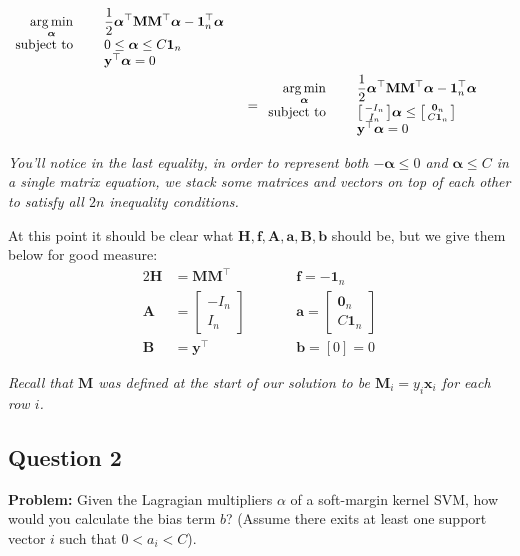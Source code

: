 \documentclass{article}
\renewcommand{\vec}[1]{\mathbf{#1}}
\newcommand{\mat}[1]{\mathbf{#1}}
\DeclareMathOperator*{\argmin}{arg\,min}
\newcommand{\icol}[1]{%
  \begin{bsmallmatrix}#1\end{bsmallmatrix}%
}
\begin{document}
\begin{align*}
\begin{array}{rcll}
        \displaystyle\argmin_{\bm\alpha} &~ &\displaystyle\frac{1}{2}\bm\alpha^\top\mat M\mat M^\top\bm\alpha-\vec1_n^\top\bm\alpha&\\
        \text{subject to}&~ &0\le\bm\alpha\le C\vec 1_n\\
        &~ &\vec y^\top\bm\alpha=0
    \end{array}\\
    &=\begin{array}{rcll}
        \displaystyle\argmin_{\bm\alpha} &~ &\displaystyle\frac{1}{2}\bm\alpha^\top\mat M\mat M^\top\bm\alpha-\vec1_n^\top\bm\alpha&\\
        \text{subject to}&~ &\icol{-I_n\\I_n}\bm\alpha\le\icol{\vec0_n\\C\vec 1_n}\\
        &~ &\vec y^\top\bm\alpha=0
    \end{array}
\end{align*}

\textit{You'll notice in the last equality, in order to represent both $-\bm\alpha\le 0$ and $\bm\alpha\le C$ in a single matrix equation, we stack some matrices and vectors on top of each other to satisfy all $2n$ inequality conditions.}
\bigskip

At this point it should be clear what $\mat H,\vec f, \mat A, \vec a, \mat B, \vec b$ should be, but we give them below for good measure:
\begin{alignat*}{2}
    \mat H&=\mat M\mat M^\top\qquad &&\vec f=-\vec 1_n\\
    \mat A&=\begin{bmatrix}
        -I_n\\I_n
    \end{bmatrix}\qquad &&\vec a=\begin{bmatrix}
        \vec 0_n\\C\vec 1_n
    \end{bmatrix}\\
    \mat B&=\vec y^\top\qquad &&\vec b=[0]=0
\end{alignat*}

\textit{Recall that $\mat M$ was defined at the start of our solution to be $\mat M_i=y_i\vec x_i$ for each row $i$.}
\bigskip
\newpage

\subsection*{Question 2}
\noindent\textbf{Problem:} Given the Lagragian multipliers $\alpha$ of a soft-margin kernel SVM, how would you calculate the bias term $b$? (Assume there exits at least one support vector $i$ such that $0<a_i<C$).
\bigskip
\end{document}
